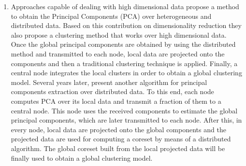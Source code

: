 \documentclass[10pt]{article}
\begin{document}
\begin{enumerate}
\item Approaches capable of dealing with high dimensional data
\cite{KHSJ01} propose a method to obtain the Principal Components (PCA) over heterogeneous and distributed data. Based on this contribution on dimensionality reduction they also propose a clustering method that works over high dimensional data. Once the global principal components are obtained by using the distributed method and transmitted to each node, local data are projected onto the components and then a traditional clustering technique is applied. Finally, a central node integrates the local clusters in order to obtain a global clustering model.
Several years later, \cite{LBK13} present another algorithm for principal components extraction over distributed data. To this end, each node computes PCA over its local data and transmit a fraction of them to a central node. This node uses the received components to estimate the global principal components, which are later transmitted to each node. After this, in every node, local data are projected onto the global components and the projected data are used for computing a coreset by means of a distributed algorithm. The global coreset built from the local projected data will be finally used to obtain a global clustering model.  


\end{enumerate}
\end{document}
